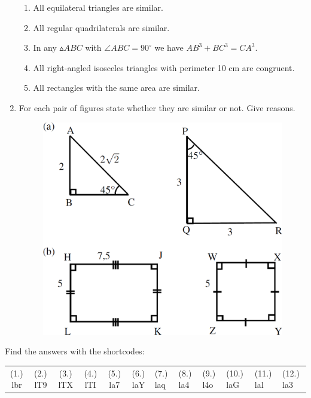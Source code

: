 \begin{enumerate}[noitemsep, label=\textbf{\arabic*}. ]
\begin{enumerate}[noitemsep, label=\textbf{\alph*}. ] 
\item All equilateral triangles are similar.
\item All regular quadrilaterals are similar.
\item In any $▵ABC$ with $\angle ABC={90}^{\circ }$ we have $A{B}^{3}+B{C}^{3}=C{A}^{3}$.
\item All right-angled isosceles triangles with perimeter 10 cm are congruent.
\item All rectangles with the same area are similar.
\end{enumerate}
\item For each pair of figures state whether they are similar or not. Give reasons.
\setcounter{subfigure}{0}
\begin{figure}[H] %
\begin{center}
\label{m39358*id320590!!!underscore!!!media}\label{m39358*id320590!!!underscore!!!printimage}\includegraphics[width=.8\columnwidth]{col11306.imgs/m39358_MG10C13_053.png} %
\vspace{2pt}
\vspace{.1in}
\end{center}
\end{figure}               \end{enumerate}

\par {} Find the answers with the shortcodes:
\par \begin{tabular}[h]{cccccc}
(1.) lbr  &  (2.) lT9  &  (3.) lTX  &  (4.) lTI  &  (5.) la7  &  (6.) laY  &  (7.) laq  &  (8.) la4  &  (9.) l4o  &  (10.) laG  &  (11.) lal  &  (12.) la3  & \end{tabular}

